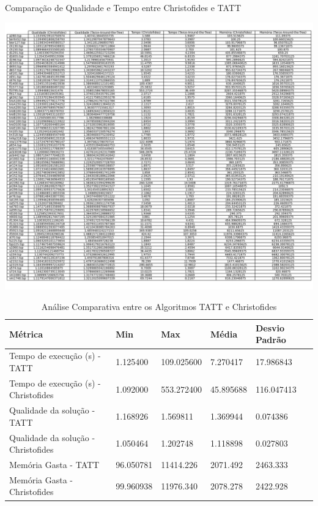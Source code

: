 \documentclass[12pt]{article}
\begin{document}
\begin{table}[ht]
\centering
\caption{Comparação de Qualidade e Tempo entre Christofides e TATT}
\label{tab:comparison}
\includegraphics[width=1.1\textwidth]{Tabela1.png}
\end{table}

\begin{table}[ht]
\caption{Análise Comparativa entre os Algoritmos TATT e Christofides}
\label{tab:comparative_analysis}
\small %
\begin{tabularx}{\textwidth}{lXXXX}
\toprule
Métrica & Min & Max & Média & Desvio Padrão \\
\midrule
Tempo de execução (s) - TATT & 1.125400 & 109.025600 & 7.270417 & 17.986843 \\
Tempo de execução (s) - Christofides & 1.092000 & 553.272400 & 45.895688 & 116.047413 \\
Qualidade da solução - TATT & 1.168926 & 1.569811 & 1.369944 & 0.074386 \\
Qualidade da solução - Christofides & 1.050464 & 1.202748 & 1.118898 & 0.027803 \\
Memória Gasta - TATT & 96.050781 & 11414.226 & 2071.492 & 2463.333 \\
Memória Gasta - Christofides & 99.960938 & 11976.340 & 2078.278 & 2422.928 \\
\bottomrule
\end{tabularx}
\end{table}
\end{document}
